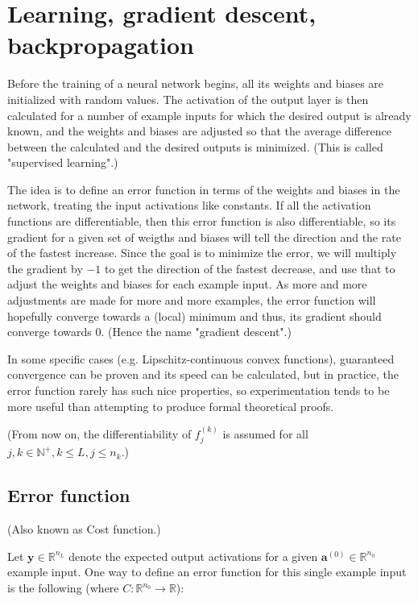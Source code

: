 \documentclass[titlepage]{article}
\begin{document}
  \section{Learning, gradient descent, backpropagation}

    Before the training of a neural network begins, all its weights and biases
    are initialized with random values. The activation of the output layer is
    then calculated for a number of example inputs for which the desired output
    is already known, and the weights and biases are adjusted so that the
    average difference between the calculated and the desired outputs is
    minimized. (This is called "supervised learning".)

    The idea is to define an error function in terms of the weights and biases
    in the network, treating the input activations like constants. If all the
    activation functions are differentiable, then this error function is also
    differentiable, so its gradient for a given set of weigths and biases will
    tell the direction and the rate of the fastest increase. Since the goal is
    to minimize the error, we will multiply the gradient by $-1$ to get the
    direction of the fastest decrease, and use that to adjust the weights and
    biases for each example input. As more and more adjustments are made for
    more and more examples, the error function will hopefully converge towards a
    (local) minimum and thus, its gradient should converge towards $0$. (Hence
    the name "gradient descent".)

    In some specific cases (e.g. Lipschitz-continuous convex functions),
    guaranteed convergence can be proven and its speed can be calculated, but
    in practice, the error function rarely has such nice properties, so
    experimentation tends to be more useful than attempting to produce formal
    theoretical proofs.

    (From now on, the differentiability of $f_j^{(k)}$ is assumed for all
    $j, k \in \mathbb{N}^+, k \leq L, j \leq n_k$.)

    \subsection{Error function}

      (Also known as Cost function.)

      Let $\mathbf{y} \in \mathbb{R}^{n_L}$ denote the expected output
      activations for a given $\mathbf{a}^{(0)} \in \mathbb{R}^{n_0}$ example
      input. One way to define an error function for this single example input
      is the following (where $C : \mathbb{R}^{n_0} \rightarrow \mathbb{R}$):
\end{document}
